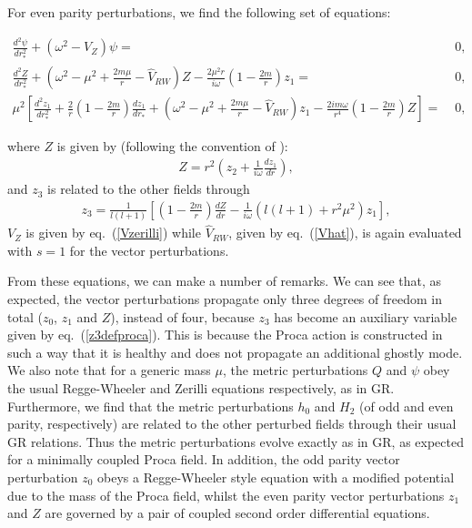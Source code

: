 \documentclass[10pt,twocolumn,preprintnumbers,amsmath,amssymb,nofootinbib
,superscriptaddress]{revtex4-1}
\begin{document}
{{{For even parity perturbations, we find the following set of equations:
\begin{widetext}
\begin{align}
\frac{d^2\psi}{dr_\ast^2}+\left(\omega^2-V_Z\right)\psi=&\;0, \nonumber\\
\frac{d^2Z}{dr_\ast^2}+\left(\omega^2-\mu^2+\frac{2m\mu}{r}-\hat{V}_{RW}\right)Z-\frac{2\mu^2r}{i\omega}\left(1-\frac{2m}{r}\right)z_1=&\;0, \nonumber\\
\mu^2\left[\frac{d^2z_1}{dr_\ast^2}+\frac{2}{r}\left(1-\frac{2m}{r}\right)\frac{dz_1}{dr_\ast}+\left(\omega^2-\mu^2+\frac{2m\mu}{r}-\hat{V}_{RW}\right)z_1-\frac{2im\omega}{r^4}\left(1-\frac{2m}{r}\right)Z\right]=&\;0,\label{EOMevenproca}
\end{align}
\end{widetext}
where $Z$ is given by (following the convention of \cite{Zhang:2006hh}):
\begin{align}
Z=r^2\left(z_2+\frac{1}{i\omega}\frac{dz_1}{dr}\right),\label{Zdefproca}
\end{align}
and $z_3$ is related to the other fields through
\begin{align}
z_3=\frac{1}{l(l+1)}\left[\left(1-\frac{2m}{r}\right)\frac{dZ}{dr}-\frac{1}{i\omega}\left(l(l+1)+r^2\mu^2\right)z_1\right],\label{z3defproca}
\end{align}
$V_Z$ is given by eq.~(\ref{Vzerilli}) while $\hat{V}_{RW}$, given by eq.~(\ref{Vhat}), is again evaluated with $s=1$ for the vector perturbations. 

From these equations, we can make a number of remarks. We can see that, as expected, the vector perturbations propagate only three degrees of freedom in total ($z_0$, $z_1$ and $Z$), instead of four, because $z_3$ has become an auxiliary variable given by eq.~(\ref{z3defproca}). This is because the Proca action is constructed in such a way that it is healthy and does not propagate an additional ghostly mode. We also note that for a generic mass $\mu$, the metric perturbations $Q$ and $\psi$ obey the usual Regge-Wheeler and Zerilli equations respectively, as in GR. Furthermore, we find that the metric perturbations $h_0$ and $H_2$ (of odd and even parity, respectively) are related to the other perturbed fields through their usual GR relations. Thus the metric perturbations evolve exactly as in GR, as expected for a minimally coupled Proca field. In addition, the odd parity vector perturbation $z_0$ obeys a Regge-Wheeler style equation with a modified potential due to the mass of the Proca field, whilst the even parity vector perturbations $z_1$ and $Z$ are governed by a pair of coupled second order differential equations.

}}}
\end{document}
